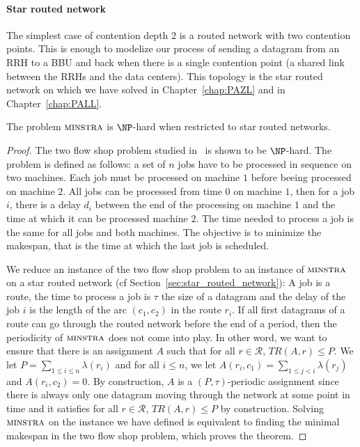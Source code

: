 \paragraph*{Star routed network}

The simplest case of contention depth $2$ is a routed network with two contention points. 
This is enough to modelize our process of sending a datagram from an RRH to a BBU and back when
there is a single contention point (a shared link between the RRHs and the data centers). 
This topology is the star routed network on which we have solved \pazl in Chapter~\ref{chap:PAZL} and \pall in Chapter~\ref{chap:PALL}.


 \begin{theorem}\label{th:spallHard}
The problem $\textsc{minstra}$ is $\NP$-hard when restricted to star routed networks.
\end{theorem}
\begin{proof}
The two flow shop problem studied in~\cite{yu2004minimizing} is shown to be $\NP$-hard. The problem is defined as follows: a set of $n$ jobs have to be processed in sequence on two machines. Each job must be processed on machine $1$ before beeing processed on machine $2$. All jobs can be processed from time $0$ on machine $1$, then for a job $i$, there is a delay $d_i$ between the end of the processing on machine $1$ and the time at which it can be processed machine $2$.  The time needed to process a job is the same for all jobs and both machines. The objective is to minimize the makespan, that is the time at which the last job is scheduled.

We reduce an instance of the two flow shop problem to an instance of $\textsc{minstra}$ on a star routed network (cf Section~\ref{sec:star_routed_network}): A job is a route, the time to process a job is $\tau$ the size of a datagram and 
 the delay of the job $i$ is the length of the arc $(c_1,c_2)$ in the route $r_i$. If all first datagrams of a route can 
 go through the routed network before the end of a period, then the periodicity of $\textsc{minstra}$ does not come into play.
 In other word, we want to ensure that there is an assignment $A$ such that for all $r \in \mathcal{R}$, $TR(A,r) \leq P$.
 We let $P = \sum_{1 \leq i\leq n} \lambda(r_i)$ and for all $i \leq n$, we let $A(r_i,c_1) = \sum_{1 \leq j < i} \lambda(r_j)$ and $A(r_i,c_2)=0$. By construction, $A$ is a $(P,\tau)$-periodic assignment since there is always only one datagram
 moving through the network at some point in time and it satisfies  for all $r \in \mathcal{R}$, $TR(A,r) \leq P$ by construction.
 Solving $\textsc{minstra}$ on the instance we have defined is equivalent to finding the minimal makespan in the two flow shop problem, which proves the theorem.
\end{proof}


